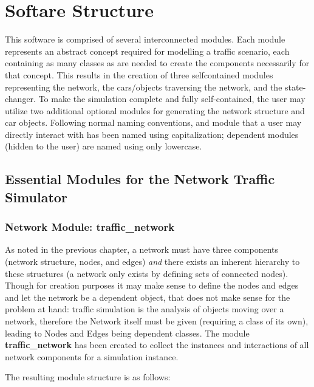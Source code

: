 \chapter{Softare Structure}
\label{Structure}

\par This software is comprised of several interconnected modules.  Each module represents an abstract concept required for modelling a traffic scenario, each containing as many classes as are needed to create the components necessarily for that concept.  This results in the creation of three self\-contained modules representing the network, the cars/objects traversing the network, and the state-changer.  To make the simulation complete and fully self-contained, the user may utilize two additional optional modules for generating the network structure and car objects. Following normal naming conventions, and module that a user may directly interact with has been named using capitalization; dependent modules (hidden to the user) are named using only lowercase.

\section{Essential Modules for the Network Traffic Simulator}

\subsection{Network Module:  traffic\_network}

\par As noted in the previous chapter, a network must have three components (network structure, nodes, and edges) \textit{and} there exists an inherent hierarchy to these structures (a network only exists by defining sets of connected nodes).  Though for creation purposes it may make sense to define the nodes and edges and let the network be a dependent object, that does not make sense for the problem at hand:  traffic simulation is the analysis of objects moving over a network, therefore the Network itself must be given (requiring a class of its own), leading to Nodes and Edges being dependent classes.  The module \textbf{traffic\_network} has been created to collect the instances and interactions of all network components for a simulation instance.  \\

\par The resulting module structure is as follows:

